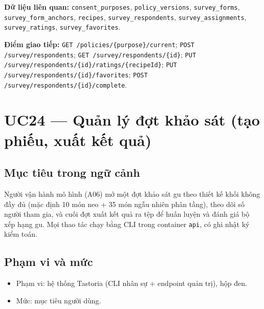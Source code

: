 \textbf{Dữ liệu liên quan:} {\small\texttt{consent\_\allowbreak{}\allowbreak{}purposes}}, {\small\texttt{policy\_\allowbreak{}\allowbreak{}versions}}, {\small\texttt{survey\_\allowbreak{}\allowbreak{}forms}}, {\small\texttt{survey\_\allowbreak{}\allowbreak{}form\_\allowbreak{}\allowbreak{}anchors}}, {\small\texttt{recipes}}, {\small\texttt{survey\_\allowbreak{}\allowbreak{}respondents}}, {\small\texttt{survey\_\allowbreak{}\allowbreak{}assignments}}, {\small\texttt{survey\_\allowbreak{}\allowbreak{}ratings}}, {\small\texttt{survey\_\allowbreak{}\allowbreak{}favorites}}.

\textbf{Điểm giao tiếp:} {\small\texttt{GET /\allowbreak{}\allowbreak{}policies/\allowbreak{}\allowbreak{}\{purpose\}/\allowbreak{}\allowbreak{}current}}; {\small\texttt{POST /\allowbreak{}\allowbreak{}survey/\allowbreak{}\allowbreak{}respondents}}; {\small\texttt{GET /\allowbreak{}\allowbreak{}survey/\allowbreak{}\allowbreak{}respondents/\allowbreak{}\allowbreak{}\{id\}}}; {\small\texttt{PUT /\allowbreak{}\allowbreak{}survey/\allowbreak{}\allowbreak{}respondents/\allowbreak{}\allowbreak{}\{id\}/\allowbreak{}\allowbreak{}ratings/\allowbreak{}\allowbreak{}\{recipeId\}}}; {\small\texttt{PUT /\allowbreak{}\allowbreak{}survey/\allowbreak{}\allowbreak{}respondents/\allowbreak{}\allowbreak{}\{id\}/\allowbreak{}\allowbreak{}favorites}}; {\small\texttt{POST /\allowbreak{}\allowbreak{}survey/\allowbreak{}\allowbreak{}respondents/\allowbreak{}\allowbreak{}\{id\}/\allowbreak{}\allowbreak{}complete}}.

\section{UC24 --- Quản lý đợt khảo sát (tạo phiếu, xuất kết quả)}
\subsection{Mục tiêu trong ngữ cảnh}
Người vận hành mô hình (A06) mở một đợt khảo sát gu theo thiết kế khối không đầy đủ (mặc định 10 món neo + 35 món ngẫu nhiên phân tầng), theo dõi số người tham gia, và cuối đợt xuất kết quả ra tệp để huấn luyện và đánh giá bộ xếp hạng gu. Mọi thao tác chạy bằng CLI trong container {\small\texttt{api}}, có ghi nhật ký kiểm toán.

\subsection{Phạm vi và mức}
\begin{itemize}
\item Phạm vi: hệ thống Tastoria (CLI nhân sự + endpoint quản trị), hộp đen.
\item Mức: mục tiêu người dùng.
\end{itemize}
